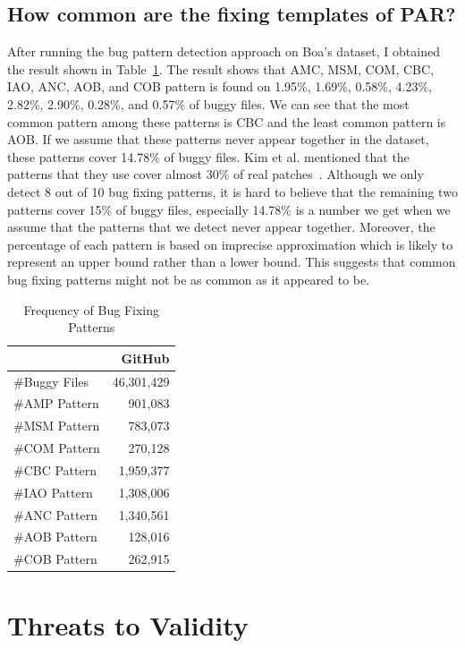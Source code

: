 \documentclass{sig-alternate-05-2015}
\begin{document}
\subsection{How common are the fixing templates of PAR?}\label{sec:freqfixpattern}
After running the bug pattern detection approach on Boa's dataset, I obtained the result shown in Table~\ref{tab:freqpattern}. The result shows that AMC, MSM, COM, CBC, IAO, ANC, AOB, and COB pattern is found on 1.95\%, 1.69\%, 0.58\%, 4.23\%, 2.82\%, 2.90\%, 0.28\%, and 0.57\% of buggy files. We can see that the most common pattern among these patterns is CBC and the least common pattern is AOB. If we assume that these patterns never appear together in the dataset, these patterns cover 14.78\% of buggy files. Kim et al. mentioned that the patterns that they use cover almost 30\% of real patches~\cite{kim2013}. Although we only detect 8 out of 10 bug fixing patterns, it is hard to believe that the remaining two patterns cover 15\% of buggy files, especially 14.78\% is a number we get when we assume that the patterns that we detect never appear together. Moreover, the percentage of each pattern is based on imprecise approximation which is likely to represent an upper bound rather than a lower bound. This suggests that common bug fixing patterns might not be as common as it appeared to be.

\begin{table}[!htb]
	\centering
	\begin{tabular}{lr} 
		\hline
		& \textbf{GitHub}\\
		\hline
		\#Buggy Files & 46,301,429 \\ 
		\#AMP Pattern & 901,083 \\
		\#MSM Pattern & 783,073 \\
		\#COM Pattern & 270,128 \\ 
		\#CBC Pattern & 1,959,377 \\  
		\#IAO Pattern & 1,308,006 \\  
		\#ANC Pattern & 1,340,561 \\  
		\#AOB Pattern & 128,016 \\  
		\#COB Pattern & 262,915 \\   
		\hline
	\end{tabular}
	\caption{Frequency of Bug Fixing Patterns}\label{tab:freqpattern}
	
\end{table}

\section{Threats to Validity} 
\end{document}
